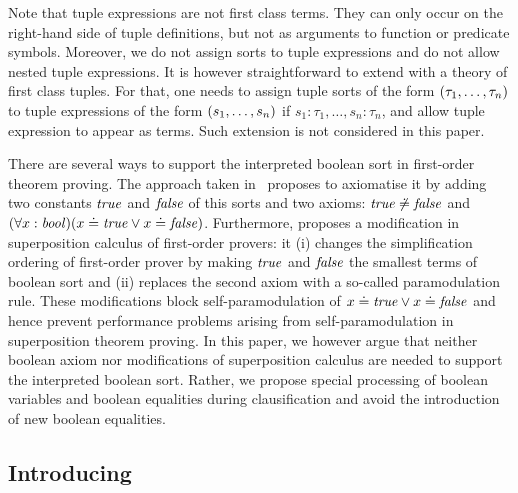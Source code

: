 Note that tuple expressions are not first class terms. They can only occur on the right-hand side of tuple definitions, but not as arguments to function or predicate symbols. Moreover, we do not assign sorts to tuple expressions and do not allow nested tuple expressions. It is however straightforward to extend \folb{} with a theory of first class tuples. For that, one needs to assign tuple sorts of the form $({\tau_1,\ldots,\tau_n})$ to tuple expressions of the form $({s_1,\ldots,s_n})$ if $s_1:\tau_1,\ldots,s_n:\tau_n$, and allow tuple expression to appear as terms. Such extension is not considered in this paper.

There are several ways to support the interpreted boolean sort in first-order theorem proving. 
The approach taken in~\cite{FOOL} proposes to axiomatise it by adding two constants $\mathit{true}$ and $\mathit{false}$ of this sorts and two axioms: $\mathit{true} \not\doteq \mathit{false}$ and $(\forall x:\mathit{bool})(x \doteq \mathit{true} \lor x \doteq \mathit{false})$. Furthermore, \cite{FOOL} proposes a modification in superposition calculus of first-order provers: it (i)
changes the  simplification ordering of first-order prover by making $\mathit{true}$ and $\mathit{false}$ the smallest terms of boolean sort 
and (ii) replaces the second axiom with a so-called \folb{} paramodulation rule. These modifications block self-paramodulation of $x \doteq \mathit{true} \lor x \doteq \mathit{false}$ and hence prevent performance problems arising from self-paramodulation in superposition theorem proving. 
In this paper, we however argue that neither boolean axiom nor modifications of superposition calculus are needed to support the interpreted boolean sort. 
Rather, we propose special processing of boolean variables and boolean equalities during clausification and avoid the introduction of new boolean equalities. 

\subsection{Introducing \nfcnf{}}

